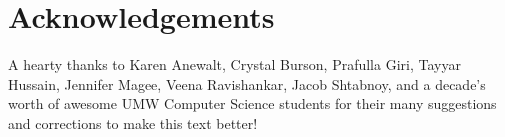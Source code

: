  
\chapter{Acknowledgements}

A hearty thanks to Karen Anewalt, Crystal Burson, Prafulla Giri, Tayyar
Hussain, Jennifer Magee, Veena Ravishankar, Jacob Shtabnoy, and a decade's
worth of awesome UMW Computer Science students for their many suggestions and
corrections to make this text better!
